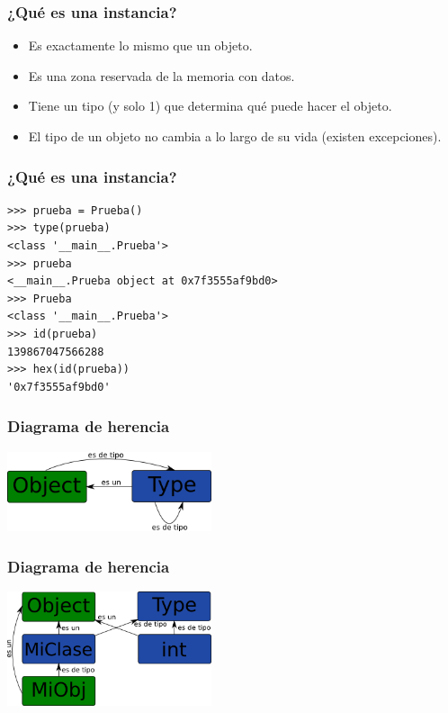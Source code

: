 \documentclass[10pt]{beamer}
\begin{document}
  \begin{frame}[containsverbatim]
    \frametitle{¿Qué es una instancia?}
    \begin{itemize}
      \item Es exactamente lo mismo que un objeto.
      \item Es una zona reservada de la memoria con datos.
      \item Tiene un tipo (y solo 1) que determina qué puede hacer el objeto.
      \item El tipo de un objeto no cambia a lo largo de su vida (existen excepciones).
    \end{itemize}
  \end{frame}

  \begin{frame}[containsverbatim]
    \frametitle{¿Qué es una instancia?}
    \begin{verbatim}
>>> prueba = Prueba()
>>> type(prueba)
<class '__main__.Prueba'>
>>> prueba
<__main__.Prueba object at 0x7f3555af9bd0>
>>> Prueba
<class '__main__.Prueba'>
>>> id(prueba)
139867047566288
>>> hex(id(prueba))
'0x7f3555af9bd0'
    \end{verbatim}
  \end{frame}

  \begin{frame}[containsverbatim]
    \frametitle{Diagrama de herencia}
    \begin{center}\includegraphics[width=6cm]{img/Object-Type-Relation.png}\end{center}
  \end{frame}

  \begin{frame}[containsverbatim]
    \frametitle{Diagrama de herencia}
    \begin{center}\includegraphics[width=6cm]{img/MyClass-BuiltinClass-Relation.png}\end{center}
  \end{frame}
\end{document}
